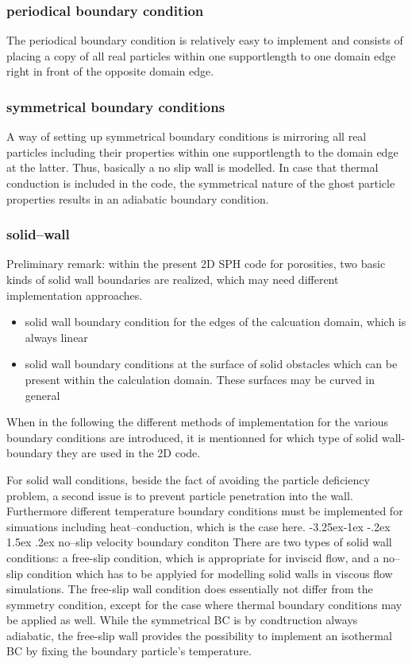 \documentclass{report}
\makeatletter
\renewcommand\paragraph{\@startsection{paragraph}{4}{\z@}%
  {-3.25ex\@plus -1ex \@minus -.2ex}%
  {1.5ex \@plus .2ex}%
  {\normalfont\normalsize\bfseries}}
\makeatother
\begin{document}
\subsubsection{periodical boundary condition}
The periodical boundary condition is relatively easy to implement and consists of placing a copy of all real particles within one supportlength to one domain edge right in front of the opposite domain edge.



\subsubsection{symmetrical boundary conditions}
A way of setting up symmetrical boundary conditions is mirroring all real particles including their properties within one supportlength to the domain edge at the latter. Thus, basically a no slip wall is modelled. In case that thermal conduction is included in the code, the symmetrical nature of the ghost particle properties results in an adiabatic boundary condition.

\subsubsection{solid--wall}
Preliminary remark: within the present 2D SPH code for porosities, two basic kinds of solid wall boundaries are realized, which may need different implementation approaches.
\begin{itemize}
 \item solid wall boundary condition for the edges of the calcuation domain, which is always linear
\item solid wall boundary conditions at the surface of solid obstacles which can be present within the calculation domain. These surfaces may be curved in general 
\end{itemize}
When in the following the different methods of implementation for the various boundary conditions are introduced, it is mentionned for which type of solid wall-boundary they are used in the 2D code. 

For solid wall conditions, beside the fact of avoiding the particle deficiency problem, a second issue is to prevent particle penetration into the wall.
Furthermore different temperature boundary conditions must be implemented for simuations including heat--conduction, which is the case here.
\paragraph{no--slip velocity boundary conditon}
There are two types of solid wall conditions: a free-slip condition, which is appropriate for inviscid flow, and a no--slip condition which has to be applyied for modelling solid walls in viscous flow simulations. The free-slip wall condition does essentially not differ from the symmetry condition, except for the case where thermal boundary conditions may be applied as well. While the symmetrical BC is by condtruction always adiabatic, the free-slip wall provides the possibility to implement an isothermal BC by fixing the boundary particle's temperature.
\end{document}
